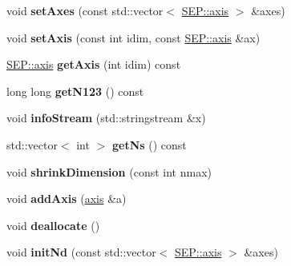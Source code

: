 \begin{DoxyCompactItemize}
void {\bfseries set\+Axes} (const std\+::vector$<$ \hyperlink{class_s_e_p_1_1axis}{S\+E\+P\+::axis} $>$ \&axes)
\item 
\mbox{\label{class_s_e_p_1_1hypercube_a66f03cfb35c3afcccce3b6a1de8d7cd4}} 
void {\bfseries set\+Axis} (const int idim, const \hyperlink{class_s_e_p_1_1axis}{S\+E\+P\+::axis} \&ax)
\item 
\mbox{\label{class_s_e_p_1_1hypercube_a0132352cbe64c6ac5d72b61b0a578021}} 
\hyperlink{class_s_e_p_1_1axis}{S\+E\+P\+::axis} {\bfseries get\+Axis} (int idim) const
\item 
\mbox{\label{class_s_e_p_1_1hypercube_a9d79fcf567305399ecd1eee483dbfbbd}} 
long long {\bfseries get\+N123} () const
\item 
\mbox{\label{class_s_e_p_1_1hypercube_a177371bdf76f0e86b0c88e433b5e9c32}} 
void {\bfseries info\+Stream} (std\+::stringstream \&x)
\item 
\mbox{\label{class_s_e_p_1_1hypercube_a33984f419ba081e8d908a896890c7243}} 
std\+::vector$<$ int $>$ {\bfseries get\+Ns} () const
\item 
\mbox{\label{class_s_e_p_1_1hypercube_ada2ebe13ad9a86490ca81a705c57e783}} 
void {\bfseries shrink\+Dimension} (const int nmax)
\item 
\mbox{\label{class_s_e_p_1_1hypercube_afcc6e193d51240991d57e95295b41a8d}} 
void {\bfseries add\+Axis} (\hyperlink{class_s_e_p_1_1axis}{axis} \&a)
\item 
\mbox{\label{class_s_e_p_1_1hypercube_a58cdef8f9f2a1db06698d01e5d3f2a18}} 
void {\bfseries deallocate} ()
\item 
\mbox{\label{class_s_e_p_1_1hypercube_a18ca5fb5f9814bf49c35b737654fd2d5}} 
void {\bfseries init\+Nd} (const std\+::vector$<$ \hyperlink{class_s_e_p_1_1axis}{S\+E\+P\+::axis} $>$ \&axes)
\item 
\mbox{\label{class_s_e_p_1_1hypercube_aa6456ea4567670b6e71215b7f0279c25}} 

\end{DoxyCompactItemize}
